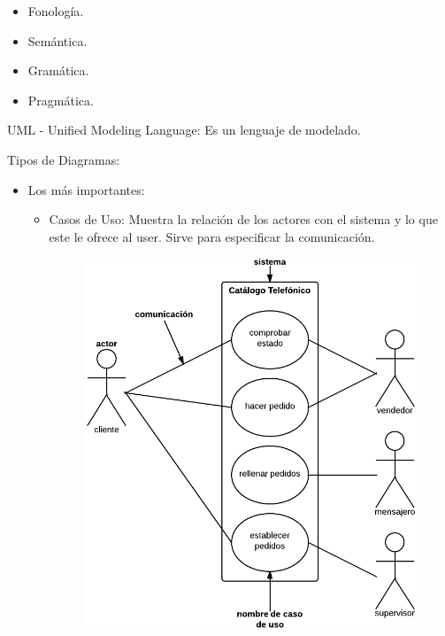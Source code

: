 \documentclass[12pt, twoside, openright]{report} %
\begin{document}
    \begin{itemize}
    
    \item
      Fonología.
    \item
      Semántica.
    \item
      Gramática.
    \item
      Pragmática.
    \end{itemize}

	UML - Unified Modeling Language: Es un lenguaje de modelado.

	Tipos de Diagramas:

    \begin{itemize}
    
    \item
      Los más importantes:

      \begin{itemize}
      \item
        Casos de Uso: Muestra la relación de los actores con el sistema
        y lo que este le ofrece al user. Sirve para especificar la
        comunicación.
		\begin{figure}[H]
			{\includegraphics[scale=.3]{Untitled 9.png}}

\end{figure}
\end{itemize}
\end{itemize}
\end{document}
